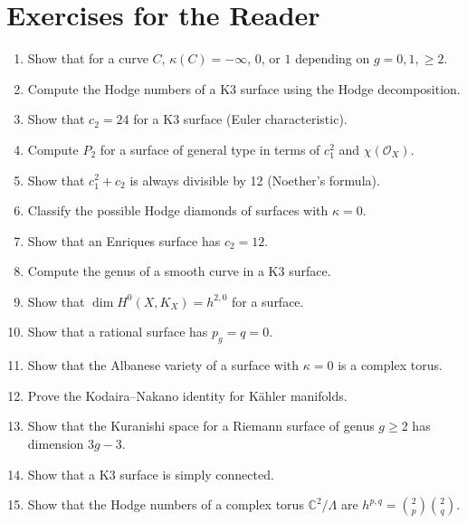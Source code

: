 \section*{Exercises for the Reader}
\begin{enumerate}
    \item [B] Show that for a curve $C$, $\kappa(C) = -\infty$, $0$, or $1$ depending on $g = 0, 1, \geq 2$.
    \item [I] Compute the Hodge numbers of a K3 surface using the Hodge decomposition.
    \item [B] Show that $c_2 = 24$ for a K3 surface (Euler characteristic).
    \item [I] Compute $P_2$ for a surface of general type in terms of $c_1^2$ and $\chi(\mathcal{O}_X)$.
    \item [I] Show that $c_1^2 + c_2$ is always divisible by 12 (Noether's formula).
    \item [A] Classify the possible Hodge diamonds of surfaces with $\kappa = 0$.
    \item [B] Show that an Enriques surface has $c_2 = 12$.
    \item [I] Compute the genus of a smooth curve in a K3 surface.
    \item [B] Show that $\dim H^0(X, K_X) = h^{2,0}$ for a surface.
    \item [B] Show that a rational surface has $p_g = q = 0$.
    \item [A] Show that the Albanese variety of a surface with $\kappa = 0$ is a complex torus.
    \item [A] Prove the Kodaira--Nakano identity for K\"{a}hler manifolds.
    \item [I] Show that the Kuranishi space for a Riemann surface of genus $g \geq 2$ has dimension $3g-3$.
    \item [I] Show that a K3 surface is simply connected.
    \item [B] Show that the Hodge numbers of a complex torus $\mathbb{C}^2 / \Lambda$ are $h^{p,q} = \binom{2}{p}\binom{2}{q}$.
\end{enumerate}

